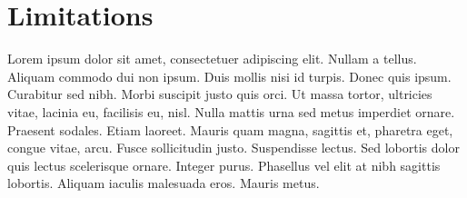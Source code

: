 \chapter{Limitations}
\label{c:limitations} Lorem ipsum dolor sit amet, consectetuer adipiscing
elit. Nullam a tellus. Aliquam commodo dui non ipsum. Duis mollis nisi id
turpis. Donec quis ipsum. Curabitur sed nibh. Morbi suscipit justo quis orci.
Ut massa tortor, ultricies vitae, lacinia eu, facilisis eu, nisl. Nulla mattis
urna sed metus imperdiet ornare. Praesent sodales. Etiam laoreet. Mauris quam
magna, sagittis et, pharetra eget, congue vitae, arcu. Fusce sollicitudin
justo. Suspendisse lectus. Sed lobortis dolor quis lectus scelerisque ornare.
Integer purus. Phasellus vel elit at nibh sagittis lobortis. Aliquam iaculis
malesuada eros. Mauris metus.
